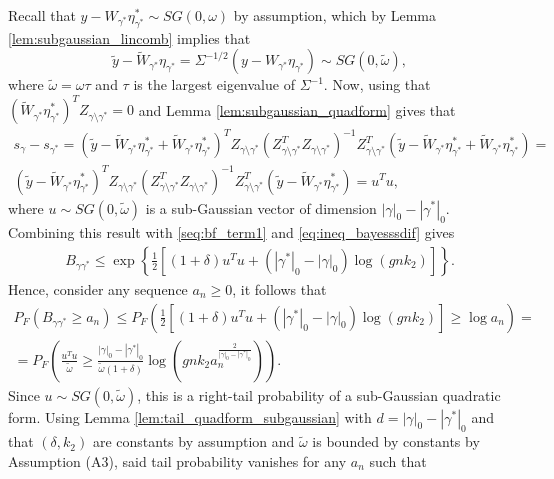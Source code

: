 Recall that $y - W_{\gamma^*} \eta_{\gamma^*}^* \sim SG(0, \omega)$ by assumption, which by Lemma \ref{lem:subgaussian_lincomb} implies that
$$
\tilde{y} - \widetilde{W}_{\gamma^*} \eta_{\gamma^*}= \Sigma^{-1/2} (y - W_{\gamma^*} \eta_{\gamma^*}) \sim SG(0, \tilde{\omega}),
$$
where $\tilde{\omega}= \omega \tau$ and $\tau$ is the largest eigenvalue of $\Sigma^{-1}$.
Now, using that $(\widetilde{W}_{\gamma^*} \eta_{\gamma^*}^*)^T Z_{\gamma \setminus \gamma^*}=0$ and Lemma \ref{lem:subgaussian_quadform} gives that
\begin{align}
 s_\gamma - s_{\gamma^*}= 
(\tilde{y} - \widetilde{W}_{\gamma^*} \eta_{\gamma^*}^* + \widetilde{W}_{\gamma^*} \eta_{\gamma^*}^*)^T Z_{\gamma \setminus \gamma^*} (Z_{\gamma \setminus \gamma^*}^T Z_{\gamma \setminus \gamma^*})^{-1} Z_{\gamma \setminus \gamma^*}^T (\tilde{y} - \widetilde{W}_{\gamma^*} \eta_{\gamma^*}^* + \widetilde{W}_{\gamma^*} \eta_{\gamma^*}^*)=
\nonumber \\
(\tilde{y} - \widetilde{W}_{\gamma^*} \eta_{\gamma^*}^*)^T Z_{\gamma \setminus \gamma^*} (Z_{\gamma \setminus \gamma^*}^T Z_{\gamma \setminus \gamma^*})^{-1} Z_{\gamma \setminus \gamma^*}^T (\tilde{y} - \widetilde{W}_{\gamma^*} \eta_{\gamma^*}^*)
=u^T u,
\nonumber
\end{align}
where $u \sim SG(0, \tilde{\omega})$ is a sub-Gaussian vector of dimension $|\gamma|_0 - |\gamma^*|_0$.
Combining this result with \eqref{seq:bf_term1} and \eqref{eq:ineq_bayesssdif} gives
\begin{align}
B_{\gamma \gamma^*} \leq
\exp \left\{  \frac{1}{2} \left[ (1 + \delta) u^Tu + (|\gamma^*|_0-|\gamma|_0) \log(g n k_2) \right] \right\}.
\nonumber
\end{align}
Hence, consider any sequence $a_n \geq 0$, it follows that
\begin{align}
 P_F \left( B_{\gamma \gamma^*} \geq a_n \right) \leq 
P_F \left( \frac{1}{2} \left[ (1 + \delta) u^Tu + (|\gamma^*|_0-|\gamma|_0) \log(g n k_2) \right] \geq \log a_n \right)=
\nonumber \\
=P_F \left(  \frac{u^Tu}{\tilde{\omega}}  \geq \frac{|\gamma|_0 - |\gamma^*|_0}{\tilde{\omega} (1+\delta)}  \log\left(g n k_2a_n^{\frac{2}{|\gamma|_0 - |\gamma^*|_0}} \right) \right).
\label{seq:bfrighttail_overfitted}
\end{align}
Since $u \sim SG(0,\tilde{\omega})$, this is a right-tail probability of a sub-Gaussian quadratic form. Using Lemma \ref{lem:tail_quadform_subgaussian} with $d= |\gamma|_0 - |\gamma^*|_0$ and that $(\delta,k_2)$ are constants by assumption and $\tilde{\omega}$ is bounded by constants by Assumption (A3), said tail probability vanishes for any $a_n$ such that
